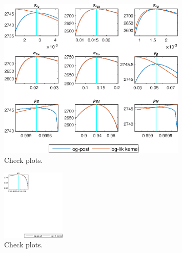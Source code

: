  
\begin{figure}[H]
\centering 
\includegraphics[width=0.80\textwidth]{BRS_growth/graphs/BRS_growth_CheckPlots1}
\caption{Check plots.}\label{Fig:CheckPlots:1}
\end{figure}
 
\begin{figure}[H]
\centering 
\includegraphics[width=0.27\textwidth]{BRS_growth/graphs/BRS_growth_CheckPlots2}
\caption{Check plots.}\label{Fig:CheckPlots:2}
\end{figure}
 
